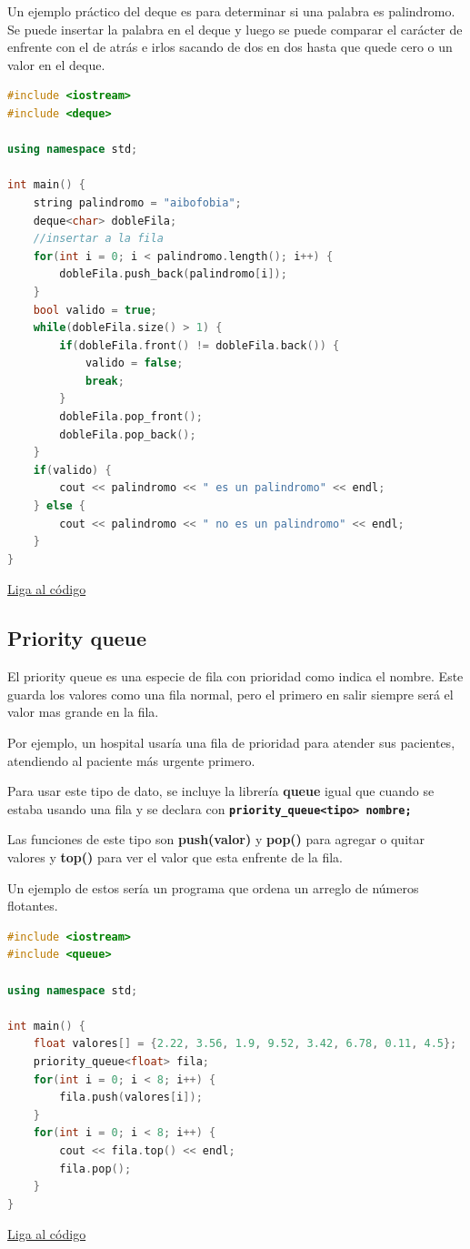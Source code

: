 \documentclass{article}
\begin{document}
Un ejemplo práctico del deque es para determinar si una palabra es palindromo. Se puede insertar la palabra en el deque y luego se puede comparar el carácter de enfrente con el de atrás e irlos sacando de dos en dos hasta que quede cero o un valor en el deque.

\begin{lstlisting}[language=C++, title=Deques]
#include <iostream>
#include <deque>

using namespace std;

int main() {
	string palindromo = "aibofobia";
	deque<char> dobleFila;
	//insertar a la fila
	for(int i = 0; i < palindromo.length(); i++) {
		dobleFila.push_back(palindromo[i]);
	}
	bool valido = true;
	while(dobleFila.size() > 1) {
		if(dobleFila.front() != dobleFila.back()) {
			valido = false;
			break;
		}
		dobleFila.pop_front();
		dobleFila.pop_back();
	}
	if(valido) {
		cout << palindromo << " es un palindromo" << endl;
	} else {
		cout << palindromo << " no es un palindromo" << endl;
	}
}
\end{lstlisting}
\href{https://repl.it/@Jamesscn/Deque}{Liga al código}

\subsection{Priority queue}

El priority queue es una especie de fila con prioridad como indica el nombre. Este guarda los valores como una fila normal, pero el primero en salir siempre será el valor mas grande en la fila.

Por ejemplo, un hospital usaría una fila de prioridad para atender sus pacientes, atendiendo al paciente más urgente primero.

Para usar este tipo de dato, se incluye la librería \textbf{queue} igual que cuando se estaba usando una fila y se declara con \textbf{\lstinline{priority_queue<tipo> nombre;}}

Las funciones de este tipo son \textbf{push(valor)} y \textbf{pop()} para agregar o quitar valores y \textbf{top()} para ver el valor que esta enfrente de la fila.

Un ejemplo de estos sería un programa que ordena un arreglo de números flotantes.

\begin{lstlisting}[language=C++, title=Filas de prioridad]
#include <iostream>
#include <queue>

using namespace std;

int main() {
	float valores[] = {2.22, 3.56, 1.9, 9.52, 3.42, 6.78, 0.11, 4.5};
	priority_queue<float> fila;
	for(int i = 0; i < 8; i++) {
		fila.push(valores[i]);
	}
	for(int i = 0; i < 8; i++) {
		cout << fila.top() << endl;
		fila.pop();
	}
}
\end{lstlisting}
\href{https://repl.it/@Jamesscn/Prioridades}{Liga al código} \\
\end{document}
